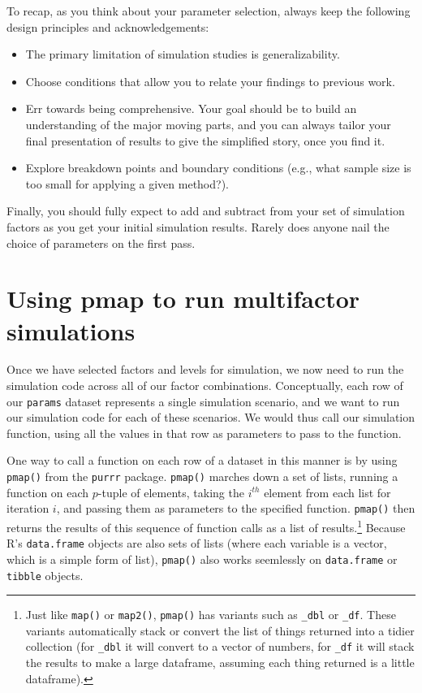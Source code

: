 \documentclass[
]{book}
\providecommand{\tightlist}{%
  \setlength{\itemsep}{0pt}\setlength{\parskip}{0pt}}
\begin{document}
To recap, as you think about your parameter selection, always keep the following design principles and acknowledgements:

\begin{itemize}
\tightlist
\item
  The primary limitation of simulation studies is generalizability.
\item
  Choose conditions that allow you to relate your findings to previous work.
\item
  Err towards being comprehensive. Your goal should be to build an understanding of the major moving parts, and you can always tailor your final presentation of results to give the simplified story, once you find it.
\item
  Explore breakdown points and boundary conditions (e.g., what sample size is too small for applying a given method?).
\end{itemize}

Finally, you should fully expect to add and subtract from your set of simulation factors as you get your initial simulation results. Rarely does anyone nail the choice of parameters on the first pass.

\section{Using pmap to run multifactor simulations}\label{using-pmap-to-run-multifactor-simulations}

Once we have selected factors and levels for simulation, we now need to run the simulation code across all of our factor combinations.
Conceptually, each row of our \texttt{params} dataset represents a single simulation scenario, and we want to run our simulation code for each of these scenarios.
We would thus call our simulation function, using all the values in that row as parameters to pass to the function.

One way to call a function on each row of a dataset in this manner is by using \texttt{pmap()} from the \texttt{purrr} package.
\texttt{pmap()} marches down a set of lists, running a function on each \(p\)-tuple of elements, taking the \(i^{th}\) element from each list for iteration \(i\), and passing them as parameters to the specified function.
\texttt{pmap()} then returns the results of this sequence of function calls as a list of results.\footnote{Just like \texttt{map()} or \texttt{map2()}, \texttt{pmap()} has variants such as \texttt{\_dbl} or \texttt{\_df}.
  These variants automatically stack or convert the list of things returned into a tidier collection (for \texttt{\_dbl} it will convert to a vector of numbers, for \texttt{\_df} it will stack the results to make a large dataframe, assuming each thing returned is a little dataframe).}
Because R's \texttt{data.frame} objects are also sets of lists (where each variable is a vector, which is a simple form of list), \texttt{pmap()} also works seemlessly on \texttt{data.frame} or \texttt{tibble} objects.
\end{document}

